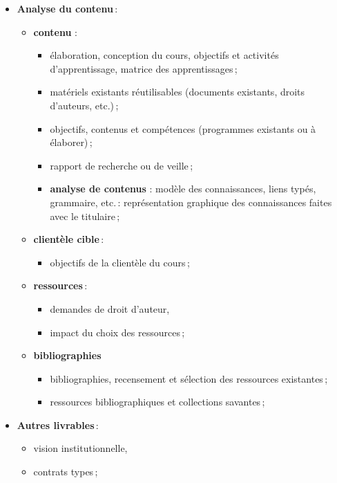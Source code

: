\begin{frame}[allowframebreaks]
\begin{itemize}
							\item \textbf{Analyse du contenu}\,: 
								\begin{itemize}
								\item \textbf{contenu }: 
									\begin{itemize}
									\item élaboration, conception du cours, objectifs et activités d’apprentissage, matrice des apprentissages\,;
									\item matériels existants réutilisables (documents existants, droits d’auteurs, etc.)\,;
									\item objectifs, contenus et compétences (programmes existants ou à élaborer)\,;
									\item rapport de recherche ou de veille\,; 
									\item \textbf{analyse de contenus }: modèle des connaissances, liens typés, grammaire, etc.\,: représentation graphique des connaissances faites avec le titulaire\,;
									\end{itemize}
								\item \textbf{clientèle cible}\,:
									\begin{itemize}
									\item objectifs de la clientèle du cours\,;
									\end{itemize}
								\item \textbf{ressources}\,: 
									\begin{itemize}
									\item demandes de droit d’auteur, 
									\item impact du choix des ressources\,;
									\end{itemize}
								\item \textbf{bibliographies}
									\begin{itemize}
									\item bibliographies, recensement et sélection des ressources existantes\,;
									\item ressources bibliographiques et collections savantes\,;
									\end{itemize}
								\end{itemize}
							\item \textbf{Autres livrables}\,: 
								\begin{itemize}
								\item vision institutionnelle,
								\item contrats types\,;
								\end{itemize}
							
							\end{itemize}	
												
					\end{frame}

